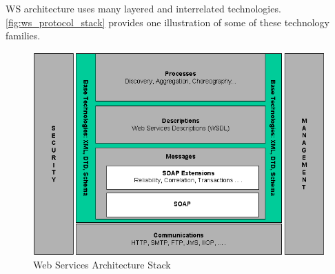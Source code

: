 WS architecture uses many layered and interrelated technologies.
\autoref{fig:ws_protocol_stack} provides one illustration of some of these technology families.

\begin{center}
 \begin{figure}[h]
	\includegraphics[width=\textwidth]{../images/background/ws_protocol_stack.png}
	\caption{Web Services Architecture Stack \cite{ws_arch} }
	\label{fig:ws_protocol_stack}
 \end{figure}
\end{center}

